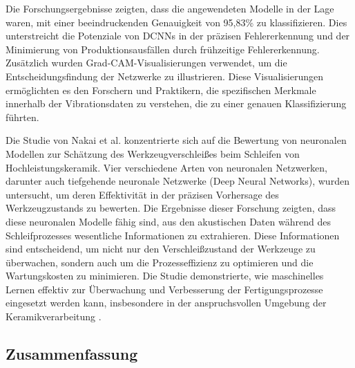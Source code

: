 Die Forschungsergebnisse zeigten, dass die angewendeten Modelle in der Lage waren, mit einer beeindruckenden Genauigkeit von 95,83\% zu klassifizieren. Dies unterstreicht die Potenziale von DCNNs in der präzisen Fehlererkennung und der Minimierung von Produktionsausfällen durch frühzeitige Fehlererkennung. Zusätzlich wurden Grad-CAM-Visualisierungen verwendet, um die Entscheidungsfindung der Netzwerke zu illustrieren. Diese Visualisierungen ermöglichten es den Forschern und Praktikern, die spezifischen Merkmale innerhalb der Vibrationsdaten zu verstehen, die zu einer genauen Klassifizierung führten.

Die Studie von Nakai et al. \cite{Nakai2015} konzentrierte sich auf die Bewertung von neuronalen Modellen zur Schätzung des Werkzeugverschleißes beim Schleifen von Hochleistungskeramik. Vier verschiedene Arten von neuronalen Netzwerken, darunter auch tiefgehende neuronale Netzwerke (Deep Neural Networks), wurden untersucht, um deren Effektivität in der präzisen Vorhersage des Werkzeugzustands zu bewerten. Die Ergebnisse dieser Forschung zeigten, dass diese neuronalen Modelle fähig sind, aus den akustischen Daten während des Schleifprozesses wesentliche Informationen zu extrahieren. Diese Informationen sind entscheidend, um nicht nur den Verschleißzustand der Werkzeuge zu überwachen, sondern auch um die Prozesseffizienz zu optimieren und die Wartungskosten zu minimieren. Die Studie demonstrierte, wie maschinelles Lernen effektiv zur Überwachung und Verbesserung der Fertigungsprozesse eingesetzt werden kann, insbesondere in der anspruchsvollen Umgebung der Keramikverarbeitung .

\subsection{Zusammenfassung}

